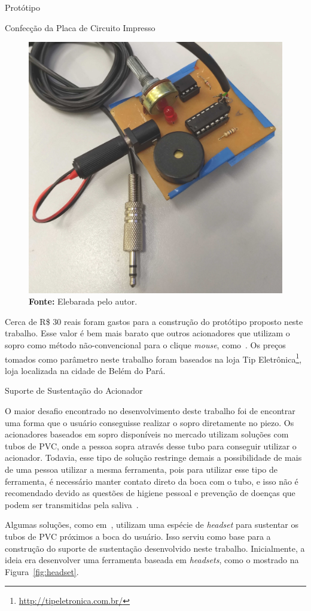 \begin{chapter}{Protótipo}
\begin{section}{Confecção da Placa de Circuito Impresso}
\begin{figure}[!h]
	\centering
	\begin{minipage}[c]{\textwidth}
	\centering
	\includegraphics[width=0.4\linewidth]{fig/puff2}
	\caption{Placa de circuito impresso construído como acionador baseado em sopro.}
	\vspace{-1cm}
	\caption*{\textbf{Fonte: }Elebarada pelo autor.}
	\label{fig:placa}
	\end{minipage}
\end{figure} 


Cerca de R\$ 30 reais
foram gastos para a construção do protótipo proposto neste trabalho. Esse valor é bem mais
barato que outros acionadores que utilizam o sopro como método não-convencional
para o clique \textit{mouse}, como~\cite{SipPuff}. Os preços tomados como
parâmetro neste trabalho foram baseados na loja Tip
Eletrônica\footnote{\url{http://tipeletronica.com.br/}}, loja localizada na
cidade de Belém do Pará. 

\end{section}


\begin{section}{Suporte de Sustentação do Acionador}

O maior desafio encontrado no desenvolvimento deste trabalho foi de encontrar
uma forma que o usuário conseguisse realizar o sopro diretamente no piezo. Os
acionadores baseados em sopro disponíveis no mercado utilizam soluções com tubos
de PVC, onde a pessoa sopra através desse tubo para conseguir utilizar o
acionador. Todavia, esse tipo de solução restringe demais a possibilidade de
mais de uma pessoa utilizar a mesma ferramenta, pois para utilizar esse tipo de
ferramenta, é necessário manter contato direto da boca com o tubo, e isso não é
recomendado devido as questões de higiene pessoal e prevenção de doenças que
podem ser transmitidas pela saliva~\cite{Li2000}.

Algumas soluções, como em~\cite{CorpPuff}, utilizam uma espécie de 
\textit{headset} para sustentar os tubos de PVC próximos a boca do usuário. Isso
serviu como base para a construção do suporte de sustentação desenvolvido neste
trabalho. Inicialmente, a ideia era desenvolver uma ferramenta baseada em
\textit{headsets}, como o mostrado na Figura~\ref{fig:headset}.


\end{section}
\end{chapter}
